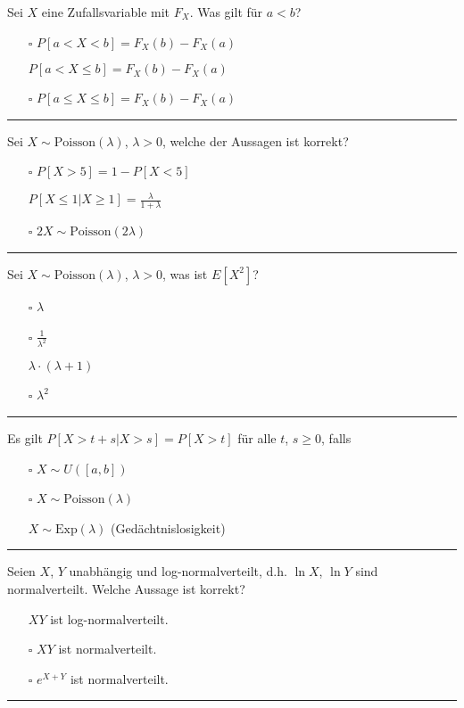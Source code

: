\begin{tiny}
    Sei $X$ eine Zufallsvariable mit $F_X$. Was gilt für $a < b$?
    \begin{itemize}
        \item[$\square$] $P[a < X < b] = F_X(b) - F_X(a)$
        \item[\checkmark] $P[a < X \leq b] = F_X(b) - F_X(a)$
        \item[$\square$] $P[a \leq X \leq b] = F_X(b) - F_X(a)$
    \end{itemize}
    \rule{\linewidth}{0.4pt}

    Sei $X \sim \text{Poisson}(\lambda)$, $\lambda > 0$, welche der Aussagen ist korrekt?
    \begin{itemize}
        \item[$\square$] $P[X > 5] = 1 - P[X < 5]$
        \item[\checkmark] $P[X \leq 1|X \geq 1] = \frac{\lambda}{1 + \lambda}$
        \item[$\square$] $2X \sim \text{Poisson}(2\lambda)$
    \end{itemize}
    \rule{\linewidth}{0.4pt}

    Sei $X \sim \text{Poisson}(\lambda)$, $\lambda > 0$, was ist $E[X^2]$?
    \begin{itemize}
        \item[$\square$] $\lambda$
        \item[$\square$] $\frac{1}{\lambda^2}$
        \item[\checkmark] $\lambda \cdot (\lambda + 1)$
        \item[$\square$] $\lambda^2$
    \end{itemize}
    \rule{\linewidth}{0.4pt}

    Es gilt $P[X > t + s | X > s] = P[X > t]$ für alle $t$, $s \geq 0$, falls
    \begin{itemize}
        \item[$\square$] $X \sim U([a, b])$
        \item[$\square$] $X \sim \text{Poisson}(\lambda)$
        \item[\checkmark] $X \sim \text{Exp}(\lambda)$ (Gedächtnislosigkeit)
    \end{itemize}
    \rule{\linewidth}{0.4pt}

    Seien $X$, $Y$ unabhängig und log-normalverteilt, d.h. $\ln X$, $\ln Y$ sind normalverteilt. Welche Aussage ist korrekt?
    \begin{itemize}
        \item[\checkmark] $XY$ ist log-normalverteilt.
        \item[$\square$] $XY$ ist normalverteilt.
        \item[$\square$] $e^{X+Y}$ ist normalverteilt.
    \end{itemize}
    \rule{\linewidth}{0.4pt}


\end{tiny}
